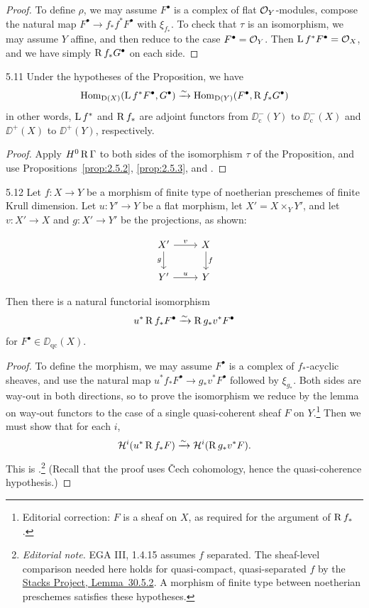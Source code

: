 \begin{proof}
To define $\rho$, we may assume $F^\bullet$ is a complex of flat $\mathcal{O}_Y$-modules, compose the natural map $F^\bullet\to f_*f^*F^\bullet$ with $\xi_{f_*}$. To check that $\tau$ is an isomorphism, we may assume $Y$ affine, and then reduce to the case $F^\bullet=\mathcal{O}_Y$. Then $\operatorname{L} f^*F^\bullet=\mathcal{O}_X$, and we have simply $\operatorname{R} f_*G^\bullet$ on each side.
\end{proof}

\begin{bookcorollary}{5.11}\label{cor:2.5.11}
Under the hypotheses of the Proposition, we have
\[
\operatorname{Hom}_{\operatorname{D}(X)}(\operatorname{L} f^*F^\bullet,G^\bullet) \xrightarrow{\sim} \operatorname{Hom}_{\operatorname{D}(Y)}(F^\bullet,\operatorname{R} f_*G^\bullet)
\]
in other words, $\operatorname{L} f^*$ and $\operatorname{R} f_*$ are adjoint functors from $\DD_{\mathrm{c}}^-(Y)$ to $\DD_{\mathrm{c}}^-(X)$ and $\DD^+(X)$ to $\DD^+(Y)$, respectively.
\end{bookcorollary}

\begin{proof}
Apply $H^0\operatorname{R}\Gamma$ to both sides of the isomorphism $\tau$ of the Proposition, and use Propositions~\ref{prop:2.5.2}, \ref{prop:2.5.3}, and .
\end{proof}

\begin{bookproposition}{5.12}\label{prop:2.5.12}
Let $f\colon X\to Y$ be a morphism of finite type of noetherian preschemes of finite Krull dimension. Let $u\colon Y'\to Y$ be a flat morphism, let $X'=X\times_Y Y'$, and let $v\colon X'\to X$ and $g\colon X'\to Y'$ be the projections, as shown:

\[
\begin{tikzcd}
	X' \arrow[r, "v"] \arrow[d, "g"'] & X \arrow[d, "f"] \\
	Y' \arrow[r, "u"] & Y
\end{tikzcd}
\]

Then there is a natural functorial isomorphism
\[
u^* \operatorname{R} f_*F^\bullet \xrightarrow{\sim} \operatorname{R} g_* v^*F^\bullet
\]
for $F^\bullet\in\DD_{\mathrm{qc}}(X)$.
\end{bookproposition}

\begin{proof}
To define the morphism, we may assume $F^\bullet$ is a complex of $f_*$-acyclic sheaves, and use the natural map $u^*f_*F^\bullet\to g_*v^*F^\bullet$ followed by $\xi_{g_*}$. Both sides are way-out in both directions, so to prove the isomorphism we reduce by the lemma on way-out functors to the case of a single quasi-coherent sheaf $F$ on $Y$.\footnote{Editorial correction: $F$ is a sheaf on $X$, as required for the argument of $\operatorname{R} f_*$.} Then we must show that for each $i$,
\[
\mathcal{H}^i(u^*\operatorname{R} f_*F) \xrightarrow{\sim} \mathcal{H}^i(\operatorname{R} g_* v^*F).
\]
This is \cite[\nopp III,~1.4.15]{EGA}.\footnote{\emph{Editorial note.} EGA III, 1.4.15 assumes $f$ separated. The sheaf-level comparison needed here holds for quasi-compact, quasi-separated $f$ by the \href{https://stacks.math.columbia.edu/tag/02KH}{Stacks Project, Lemma~30.5.2}. A morphism of finite type between noetherian preschemes satisfies these hypotheses.} (Recall that the proof uses \v{C}ech cohomology, hence the quasi-coherence hypothesis.)
\end{proof}

